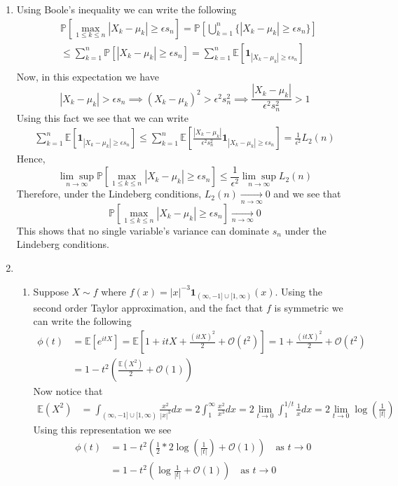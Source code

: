 \documentclass[12pt]{article}  %
\newcommand{\e}{{\epsilon}}
\newcommand{\E}{{\mathbb{E}}}
\newcommand{\prob}{{\mathbb{P}}}
\newcommand{\ind}{{\mathbf{1}}}
\begin{document}
\begin{enumerate}
\item Using Boole's inequality we can write the following 
\begin{align*}
&\prob\left[\underset{1\leq k\leq n}{\max}|X_k - \mu_k|\geq \e s_n\right] = \prob\left[\bigcup_{k = 1}^n\{|X_k - \mu_k|\geq \e s_n\}\right]\\
&\leq \sum_{k=1}^{n}\prob\left[|X_k - \mu_k|\geq \e s_n\right] = \sum_{k=1}^{n}\E\left[\ind_{|X_k - \mu_k|\geq \e s_n}\right]\\
\end{align*} 
Now, in this expectation we have $$|X_k-\mu_k|>\e s_n\implies(X_k-\mu_k)^2>\e^2 s_n^2\implies \frac{|X_k-\mu_k|}{\e^2 s_n^2}>1$$ Using this fact we see that we can write 
\begin{align*}
\sum_{k=1}^{n}\E\left[\ind_{|X_k - \mu_k|\geq \e s_n}\right]\leq \sum_{k=1}^{n}\E\left[\frac{|X_k-\mu_k|}{\e^2 s_n^2}\ind_{|X_k - \mu_k|\geq \e s_n}\right] = \frac{1}{\e^2}L_2(n)
\end{align*}
Hence, $$\underset{n\to\infty}{\lim\sup}\prob\left[\underset{1\leq k\leq n}{\max}|X_k - \mu_k|\geq \e s_n\right]\leq \frac{1}{\e^2}\underset{n\to\infty}{\lim\sup}L_2(n)$$ Therefore, under the Lindeberg conditions, $L_2(n)\underset{n\to\infty}{\longrightarrow} 0$ and we see that $$\prob\left[\underset{1\leq k\leq n}{\max}|X_k - \mu_k|\geq \e s_n\right]\underset{n\to\infty}{\longrightarrow}0$$ This shows that no single variable's variance can dominate $s_n$ under the Lindeberg conditions.

\item 
\begin{enumerate}
\item Suppose $X\sim f$ where $f(x) = |x|^{-3}\ind_{(\infty,-1]\cup[1,\infty)}(x)$. Using the second order Taylor approximation, and the fact that $f$ is symmetric we can write the following 
\begin{align*}
\phi(t) &= \E[e^{itX}] = \E[1 + itX + \frac{(itX)^2}{2} + \mathcal{O}(t^2)] = 1 + \frac{(itX)^2}{2} + \mathcal{O}(t^2)\\
&= 1 - t^2\left(\frac{\E(X^2)}{2} + \mathcal{O}(1)\right)
\end{align*}
Now notice that 
\begin{align*}
\E(X^2) &= \int_{(\infty,-1]\cup[1,\infty)} \frac{x^2}{|x|^3}dx = 2\int_{1}^{\infty}\frac{x^2}{x^3}dx = 2\lim_{t\to 0}\int_{1}^{1/t}\frac{1}{x}dx = 2\lim_{t\to0}\log\left(\frac{1}{|t|}\right)
\end{align*}
Using this representation we see 
\begin{align*}
\phi(t) &= 1 - t^2\left(\frac{1}{2}*2\log(\frac{1}{|t|}) +\mathcal{O}(1)\right)\hspace{1em}\text{as $t\to0$}\\
&= 1 - t^2\left(\log\frac{1}{|t|} +\mathcal{O}(1)\right)\hspace{1em}\text{as $t\to0$}
\end{align*}


\end{enumerate}
\end{enumerate}
\end{document}
